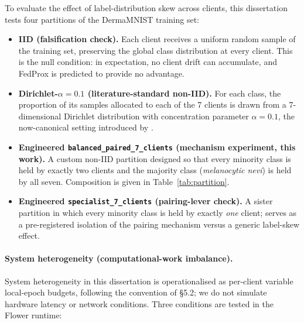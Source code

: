 \documentclass[11pt,a4paper]{report}  %
\begin{document}
To evaluate the effect of label-distribution skew across clients,
this dissertation tests four partitions of the DermaMNIST training
set:

\begin{itemize}
\item \textbf{IID (falsification check).} Each client receives a
uniform random sample of the training set, preserving the global class
distribution at every client. This is the null condition: in
expectation, no client drift can accumulate, and FedProx is predicted
to provide no advantage.
\item \textbf{Dirichlet-$\alpha = 0.1$ (literature-standard non-IID).}
For each class, the proportion of its samples allocated to each of the
7 clients is drawn from a 7-dimensional Dirichlet distribution with
concentration parameter $\alpha = 0.1$, the now-canonical setting
introduced by \citet{hsu2019dirichlet}.
\item \textbf{Engineered \texttt{balanced\_paired\_7\_clients} (mechanism
experiment, this work).} A custom non-IID partition designed so that
every minority class is held by exactly two clients and the majority
class (\textit{melanocytic nevi}) is held by all seven. Composition is
given in Table~\ref{tab:partition}.
\item \textbf{Engineered \texttt{specialist\_7\_clients} (pairing-lever
check).} A sister partition in which every minority class is held by
exactly \emph{one} client; serves as a pre-registered isolation of the
pairing mechanism versus a generic label-skew effect.
\end{itemize}


\paragraph{System heterogeneity (computational-work imbalance).}

System heterogeneity in this dissertation is operationalised as
per-client variable local-epoch budgets, following the convention of
\citet{li2020fedprox} §5.2; we do not simulate hardware latency or
network conditions. Three conditions are tested in the Flower runtime:
\end{document}
